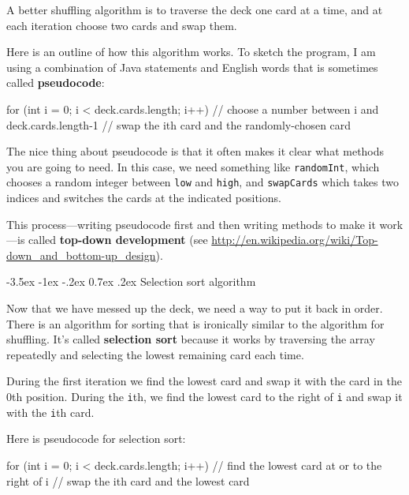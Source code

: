 \documentclass[12pt]{book}
\makeatletter
\renewcommand{\section}{\@startsection {section}{1}{\z@}%
    {-3.5ex \@plus -1ex \@minus -.2ex}%
    {0.7ex \@plus.2ex}%
    {\normalfont\Large\bfseries}}
\theoremstyle{exercise}
\newcommand{\java}[1]{\lstinline{#1}} %
\makeatother
\begin{document}
A better shuffling algorithm is to traverse the deck one card at a time, and at each iteration choose two cards and swap them.

Here is an outline of how this algorithm works.
To sketch the program, I am using a combination of Java statements and English words that is sometimes called {\bf pseudocode}:


\begin{code}
    for (int i = 0; i < deck.cards.length; i++) {
        // choose a number between i and deck.cards.length-1
        // swap the ith card and the randomly-chosen card
    }
\end{code}

The nice thing about pseudocode is that it often makes it clear what methods you are going to need.
In this case, we need something like \java{randomInt}, which chooses a random integer between \java{low} and \java{high}, and \java{swapCards} which takes two indices and switches the cards at the indicated positions.


This process---writing pseudocode first and then writing methods to make it work---is called {\bf top-down development} (see \url{http://en.wikipedia.org/wiki/Top-down_and_bottom-up_design}).


\section{Selection sort algorithm}
\label{sorting}

Now that we have messed up the deck, we need a way to put it back in order.
There is an algorithm for sorting that is ironically similar to the algorithm for shuffling.
It's called {\bf selection sort} because it works by traversing the array repeatedly and selecting the lowest remaining card each time.


During the first iteration we find the lowest card and swap it with the card in the 0th position.
During the \java{i}th, we find the lowest card to the right of \java{i} and swap it with the \java{i}th card.

Here is pseudocode for selection sort:

\begin{code}
    for (int i = 0; i < deck.cards.length; i++) {
        // find the lowest card at or to the right of i
        // swap the ith card and the lowest card
    }
\end{code}
\end{document}
